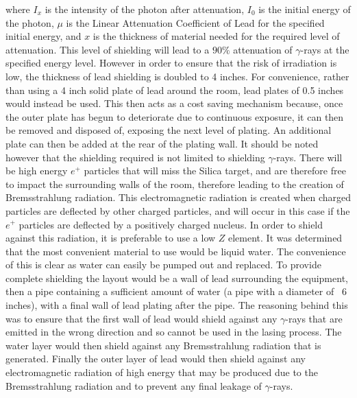 where $I_x$ is the intensity of the photon after attenuation, $I_0$ is the initial energy of the photon, $\mu$ is the Linear Attenuation Coefficient of Lead for the specified initial energy, and $x$ is the thickness of material needed for the required level of attenuation. This level of shielding will lead to a $90\%$ attenuation of $\gamma$-rays at the specified energy level. However in order to ensure that the risk of irradiation is low, the thickness of lead shielding is doubled to 4 inches. For convenience, rather than using a 4 inch solid plate of lead around the room, lead plates of 0.5 inches would instead be used. This then acts as a cost saving mechanism because, once the outer plate has begun to deteriorate due to continuous exposure, it can then be removed and disposed of, exposing the next level of plating. An additional plate can then be added at the rear of the plating wall. It should be noted however that the shielding required is not limited to shielding $\gamma$-rays. There will be high energy $e^+$ particles that will miss the Silica target, and are therefore free to impact the surrounding walls of the room, therefore leading to the creation of Bremsstrahlung radiation. This electromagnetic radiation is created when charged particles are deflected by other charged particles, and will occur in this case if the $e^+$ particles are deflected by a positively charged nucleus. In order to shield against this radiation, it is preferable to use a low $Z$ element. It was determined that the most convenient material to use would be liquid water. The convenience of this is clear as water can easily be pumped out and replaced. To provide complete shielding the layout would be a wall of lead surrounding the equipment, then a pipe containing a sufficient amount of water (a pipe with a diameter of ~6 inches), with a final wall of lead plating after the pipe. The reasoning behind this was to ensure that the first wall of lead would shield against any $\gamma$-rays that are emitted in the wrong direction and so cannot be used in the lasing process. The water layer would then shield against any Bremsstrahlung radiation that is generated. Finally the outer layer of lead would then shield against any electromagnetic radiation of high energy that may be produced due to the Bremsstrahlung radiation and to prevent any final leakage of $\gamma$-rays.
